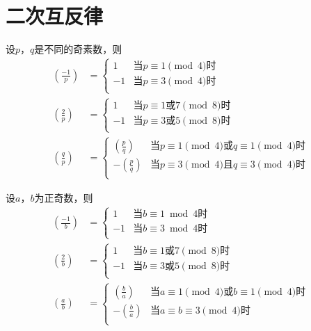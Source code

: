 \chapter{二次互反律}
\begin{theorem}[二次互反律]
设$p$，$q$是不同的奇素数，则
\begin{align*}
\left(\frac{-1}{p}\right)&=
\begin{cases}
    1&\text{当$p\equiv1\pmod4$时}\\
    -1&\text{当$p\equiv3\pmod4$时}\\
\end{cases} \\
\left(\frac{2}{p}\right)&=
\begin{cases}
    1&\text{当$p\equiv1$或$7\pmod8$时}\\
    -1&\text{当$p\equiv3$或$5\pmod8$时}\\
\end{cases} \\
\left(\frac{q}{p}\right)&=
\begin{cases}
    \left(\frac{p}{q}\right)&\text{当$p\equiv1\pmod4$或$q\equiv1\pmod4$时}\\
    -\left(\frac{p}{q}\right)&\text{当$p\equiv3\pmod4$且$q\equiv3\pmod4$时}\\
\end{cases} 
\end{align*}
\end{theorem}
\begin{theorem}[广义二次互反律]
设$a$，$b$为正奇数，则
\begin{align*}
\left(\frac{-1}{b}\right)&=
\begin{cases}
    1&\text{当$b\equiv1\bmod4$时}\\
    -1&\text{当$b\equiv3\bmod4$时}\\
\end{cases} \\
\left(\frac{2}{b}\right)&=
\begin{cases}
    1&\text{当$b\equiv1$或$7\pmod8$时}\\
    -1&\text{当$b\equiv3$或$5\pmod8$时}\\
\end{cases} \\
\left(\frac{a}{b}\right)&=
\begin{cases}
    \left(\frac{b}{a}\right)&\text{当$a\equiv1\pmod4$或$b\equiv1\pmod4$时}\\
    -\left(\frac{b}{a}\right)&\text{当$a\equiv b\equiv 3\pmod4$时}\\
\end{cases} 
\end{align*}
\end{theorem}
